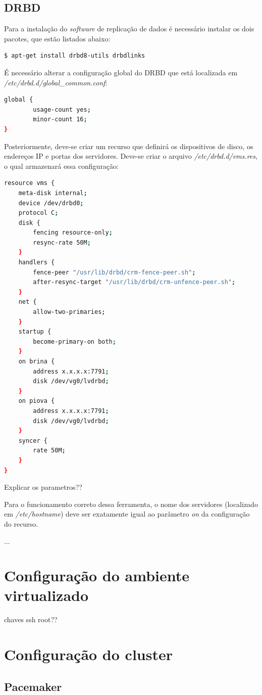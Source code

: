 \subsection{DRBD}

Para a instalação do \textit{software} de replicação de dados é necessário instalar os dois pacotes, que estão listados abaixo:
\begin{lstlisting}[language=bash]
 $ apt-get install drbd8-utils drbdlinks
\end{lstlisting}

É necessário alterar a configuração global do \ac{DRBD} que está localizada em \textit{/etc/drbd.d/global\_common.conf}:
\begin{lstlisting}[language=bash]
global {
        usage-count yes;
        minor-count 16;
}
\end{lstlisting}

Posteriormente, deve-se criar um recurso que definirá os dispositivos de disco, os endereços \ac{IP} e portas dos servidores.
Deve-se criar o arquivo \textit{/etc/drbd.d/vms.res}, o qual armazenará essa configuração:
\begin{lstlisting}[language=bash]
 resource vms {
    meta-disk internal;
    device /dev/drbd0;
    protocol C;
    disk {
        fencing resource-only;
        resync-rate 50M;
    }
    handlers {
        fence-peer "/usr/lib/drbd/crm-fence-peer.sh";
        after-resync-target "/usr/lib/drbd/crm-unfence-peer.sh";
    }
    net {
        allow-two-primaries;
    }
    startup {
        become-primary-on both;
    }
    on brina {
        address x.x.x.x:7791;
        disk /dev/vg0/lvdrbd;
    }
    on piova {
        address x.x.x.x:7791;
        disk /dev/vg0/lvdrbd;
    }
    syncer {
        rate 50M;
    }
}
\end{lstlisting}
Explicar os parametros??

Para o funcionamento correto dessa ferramenta, o nome dos servidores (localizado em \textit{/etc/hostname}) deve ser exatamente igual ao parâmetro
\textit{on} da configuração do recurso.

...

\section{Configuração do ambiente virtualizado}

chaves ssh root??

\section{Configuração do cluster}


\subsection{Pacemaker}

